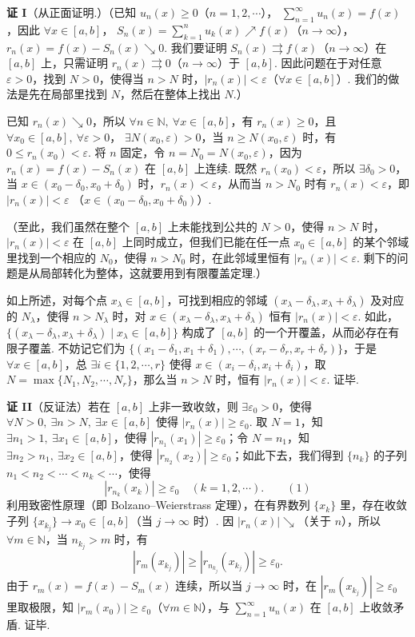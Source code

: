 \documentclass[UTF8,12pt,a4paper,fontset=fandol]{ctexart}
\begin{document}
\noindent\textbf{证 I}\quad （从正面证明.）（已知 $u_n(x)\ge0$（$n=1,2,\cdots$），
$\displaystyle\sum_{n=1}^{\infty}u_n(x)=f(x)$，因此 $\forall x\in[a,b]$，
$S_n(x)=\displaystyle\sum_{k=1}^{n}u_k(x)\nearrow f(x)$（$n\to\infty$），
$r_n(x)=f(x)-S_n(x)\searrow0$. 我们要证明
$S_n(x)\rightrightarrows f(x)$（$n\to\infty$）在 $[a,b]$ 上，只需证明
$r_n(x)\rightrightarrows0$（$n\to\infty$）于 $[a,b]$. 因此问题在于对任意 $\varepsilon>0$，找到
$N>0$，使得当 $n>N$ 时，$|r_n(x)|<\varepsilon$（$\forall x\in[a,b]$）. 我们的做法是先在局部里找到
$N$，然后在整体上找出 $N$.）

已知 $r_n(x)\searrow0$，所以 $\forall n\in\mathbb N,\ \forall x\in[a,b]$，有
$r_n(x)\ge0$，且 $\forall x_0\in[a,b],\ \forall\varepsilon>0$，
$\exists N(x_0,\varepsilon)>0$，当 $n\ge N(x_0,\varepsilon)$ 时，有
$0\le r_n(x_0)<\varepsilon$. 将 $n$ 固定，令 $n=N_0=N(x_0,\varepsilon)$，因为
$r_n(x)=f(x)-S_n(x)$ 在 $[a,b]$ 上连续. 既然 $r_n(x_0)<\varepsilon$，所以
$\exists\delta_0>0$，当 $x\in(x_0-\delta_0,x_0+\delta_0)$ 时，$r_n(x)<\varepsilon$，从而当
$n>N_0$ 时有 $r_n(x)<\varepsilon$，即 $|r_n(x)|<\varepsilon$
（$x\in(x_0-\delta_0,x_0+\delta_0)$）.

（至此，我们虽然在整个 $[a,b]$ 上未能找到公共的 $N>0$，使得 $n>N$ 时，
$|r_n(x)|<\varepsilon$ 在 $[a,b]$ 上同时成立，但我们已能在任一点 $x_0\in[a,b]$ 的某个邻域里找到一个相应的
$N_0$，使得 $n>N_0$ 时，在此邻域里恒有 $|r_n(x)|<\varepsilon$. 剩下的问题是从局部转化为整体，这就要用到有限覆盖定理.）

如上所述，对每个点 $x_\lambda\in[a,b]$，可找到相应的邻域
$(x_\lambda-\delta_\lambda,x_\lambda+\delta_\lambda)$ 及对应的 $N_\lambda$，使得
$n>N_\lambda$ 时，对 $x\in(x_\lambda-\delta_\lambda,x_\lambda+\delta_\lambda)$ 恒有
$|r_n(x)|<\varepsilon$. 如此，
$\{(x_\lambda-\delta_\lambda,x_\lambda+\delta_\lambda)\mid x_\lambda\in[a,b]\}$
构成了 $[a,b]$ 的一个开覆盖，从而必存在有限子覆盖. 不妨记它们为
$\{(x_1-\delta_1,x_1+\delta_1),\cdots,(x_r-\delta_r,x_r+\delta_r)\}$，于是
$\forall x\in[a,b]$，总 $\exists i\in\{1,2,\cdots,r\}$ 使得
$x\in(x_i-\delta_i,x_i+\delta_i)$，取 $N=\max\{N_1,N_2,\cdots,N_r\}$，那么当
$n>N$ 时，恒有 $|r_n(x)|<\varepsilon$. 证毕.

\noindent\textbf{证 II}\quad （反证法）若在 $[a,b]$ 上非一致收敛，则 $\exists\varepsilon_0>0$，使得
$\forall N>0,\ \exists n>N,\ \exists x\in[a,b]$ 使得 $|r_n(x)|\ge\varepsilon_0$. 取
$N=1$，知 $\exists n_1>1,\ \exists x_1\in[a,b]$，使得
$|r_{n_1}(x_1)|\ge\varepsilon_0$；令 $N=n_1$，知
$\exists n_2>n_1,\ \exists x_2\in[a,b]$，使得
$|r_{n_2}(x_2)|\ge\varepsilon_0$；如此下去，我们得到
$\{n_k\}$ 的子列 $n_1<n_2<\cdots<n_k<\cdots$，使得
\[
  |r_{n_k}(x_k)|\ge\varepsilon_0\quad(k=1,2,\cdots).
\qquad(1)
\]
利用致密性原理（即 Bolzano--Weierstrass 定理），在有界数列 $\{x_k\}$ 里，存在收敛子列
$\{x_{k_j}\}\to x_0\in[a,b]$（当 $j\to\infty$ 时）. 因
$|r_n(x)|\searrow$（关于 $n$），所以 $\forall m\in\mathbb N$，当 $n_{k_j}>m$ 时，有
\[
  |r_m(x_{k_j})|\ge |r_{n_{k_j}}(x_{k_j})|\ge\varepsilon_0.
\]
由于 $r_m(x)=f(x)-S_m(x)$ 连续，所以当 $j\to\infty$ 时，在
$|r_m(x_{k_j})|\ge\varepsilon_0$ 里取极限，知
$|r_m(x_0)|\ge\varepsilon_0$（$\forall m\in\mathbb N$），与
$\displaystyle\sum_{n=1}^{\infty}u_n(x)$ 在 $[a,b]$ 上收敛矛盾. 证毕.
\end{document}
